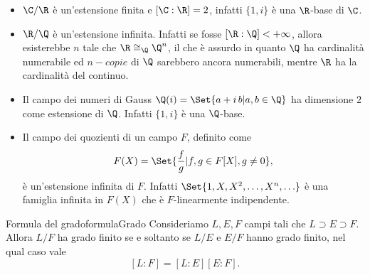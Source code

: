 \begin{ese}
	\begin{itemize}
		\item \(\C/\R\) è un'estensione finita e \([\C:\R]=2\), infatti \(\{1,i\}\) è una \(\R\)-base di \(\C\).
		      \item\(\R/\Q\) è un'estensione infinita. Infatti se fosse \([\R:\Q]<+\infty\), allora esisterebbe \(n\) tale che \(\R\cong_\Q \Q^n\), il che è assurdo in quanto \(\Q\) ha cardinalità numerabile ed \(n-copie\) di \(\Q\) sarebbero ancora numerabili, mentre \(\R\) ha la cardinalità del continuo.
		\item Il campo dei numeri di Gauss \(\Q(i) = \Set{a+i\,b | a,b\in\Q}\) ha dimensione \(2\) come estensione di \(\Q\). Infatti \(\{1,i\}\) è una \(\Q\)-base.
		\item Il campo dei quozienti di un campo \(F\), definito come
		      \[
			      F(X) = \Set{\frac{f}{g} | f,g\in F[X],g\neq 0},
		      \]
		      è un'estensione infinita di \(F\). Infatti \(\Set{1,X,X^2,\ldots,X^n,\ldots}\) è una famiglia infinita in \(F(X)\) che è \(F\)-linearmente indipendente.
	\end{itemize}
\end{ese}

\begin{prop}{Formula del grado}{formulaGrado}
	Consideriamo \(L,E,F\) campi tali che \(L\supset E\supset F\). Allora \(L/F\) ha grado finito se e soltanto se \(L/E\) e \(E/F\) hanno grado finito, nel qual caso vale
	\[
		[L:F]=[L:E][E:F].
	\]
\end{prop}

